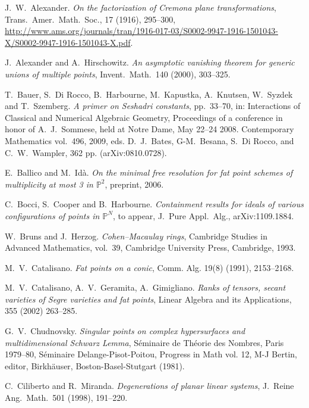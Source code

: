 \documentclass[11pt,twoside]{amsart}
\numberwithin{equation}{section}
\theoremstyle{definition}
\begin{document}
\begin{thebibliography}{B. et al}

 J.\ W.\ Alexander.
\emph{On the factorization of Cremona plane transformations},
Trans.\ Amer.\ Math.\ Soc., 17 (1916), 295--300,
\url{http://www.ams.org/journals/tran/1916-017-03/S0002-9947-1916-1501043-X/S0002-9947-1916-1501043-X.pdf}.

 J.\ Alexander and A.\ Hirschowitz.
\emph{An asymptotic vanishing theorem for generic unions of multiple points}, 
Invent.\ Math.\ 140 (2000), 303--325.

 T.\ Bauer, S.\ Di Rocco, B.\ Harbourne, M.\ Kapustka, A.\ Knutsen, W.\ 
Syzdek and T.\ Szemberg. \emph{A primer on Seshadri constants}, 
pp.\ 33--70, in:
Interactions of Classical and Numerical Algebraic Geometry, 
Proceedings of a conference in honor of A.\ J.\ Sommese, held at Notre Dame, May 22--24 2008.
Contemporary Mathematics vol.\ 496, 2009, eds.
D.\ J.\ Bates, G-M.\ Besana, S.\ Di Rocco, and C.\ W.\ Wampler,  362 pp.
(arXiv:0810.0728).

 E.\ Ballico and M.\ Id\`a. 
\emph{On the minimal free resolution for fat point schemes of multiplicity at most 3 in ${\mathbb{P}^{2}}$}, 
preprint, 2006. 

 C.\ Bocci, S.\ Cooper and B.\ Harbourne.
{\it Containment results for ideals of various configurations of points in ${\mathbb{P}^{N}}$},
to appear, J.\ Pure Appl.\ Alg., arXiv:1109.1884.

 W.\ Bruns and J.\ Herzog. 
\emph{Cohen--Macaulay rings}, Cambridge Studies in Advanced Mathematics, 
vol.\ 39, Cambridge University Press, Cambridge, 1993.

 M.\ V.\ Catalisano.
\emph{Fat points on a conic}, 
Comm. Alg. 19(8) (1991), 2153--2168. 

M.\ V.\ Catalisano, A.\ V.\ Geramita, A.\ Gimigliano.
\emph{Ranks of tensors, secant varieties of Segre varieties and fat points},
Linear Algebra and its Applications, 355 (2002) 263--285.

  G.\ V.\ Chudnovsky. \emph{Singular points on complex 
hypersurfaces and multidimensional
Schwarz Lemma}, S\'eminaire de Th\'eorie des Nombres, Paris 1979--80,
S\'eminaire Delange-Pisot-Poitou, Progress in Math vol. 12, M-J Bertin, editor,
Birkh\"auser, Boston-Basel-Stutgart (1981).

 C.\ Ciliberto and R.\ Miranda.
\emph{Degenerations of planar linear systems}, 
J.\ Reine Ang.\ Math.\ 501 (1998), 191--220.


\end{thebibliography}
\end{document}
